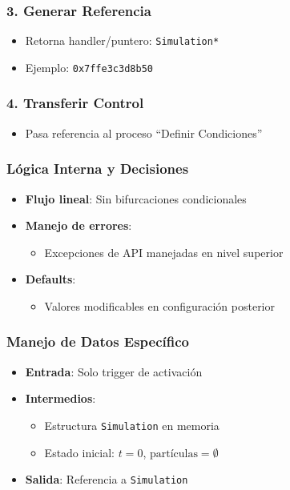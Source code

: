 \subsubsection*{3. Generar Referencia}
\begin{itemize}
    \item Retorna handler/puntero: \texttt{Simulation*}
    \item Ejemplo: \texttt{0x7ffe3c3d8b50} %
\end{itemize}

\subsubsection*{4. Transferir Control}
\begin{itemize}
    \item Pasa referencia al proceso ``Definir Condiciones''
\end{itemize}

\subsubsection{Lógica Interna y Decisiones}
\begin{itemize}
    \item \textbf{Flujo lineal}: Sin bifurcaciones condicionales
    \item \textbf{Manejo de errores}:
    \begin{itemize}
        \item Excepciones de API manejadas en nivel superior
    \end{itemize}
    \item \textbf{Defaults}:
    \begin{itemize}
        \item Valores modificables en configuración posterior
    \end{itemize}
\end{itemize}

\subsubsection{Manejo de Datos Específico}
\begin{itemize}
    \item \textbf{Entrada}: Solo trigger de activación
    \item \textbf{Intermedios}:
    \begin{itemize}
        \item Estructura \texttt{Simulation} en memoria
        \item Estado inicial: $t=0$, $\text{partículas}=\emptyset$
    \end{itemize}
    \item \textbf{Salida}: Referencia a \texttt{Simulation}
\end{itemize}

